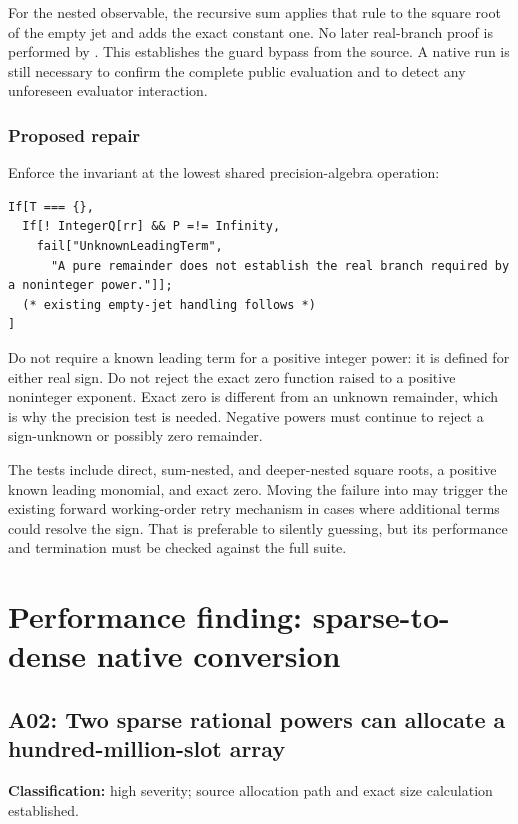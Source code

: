\documentclass[11pt,letterpaper]{article}
\newcommand{\code}[1]{\texttt{\detokenize{#1}}}
\newcommand{\finding}[3]{\subsection{#1: #2}\textbf{Classification:} #3.\par}
\begin{document}
For the nested observable, the recursive sum applies that rule to the square root of the empty jet and adds the exact constant one. No later real-branch proof is performed by \code{seriesMake}. This establishes the guard bypass from the source. A native run is still necessary to confirm the complete public evaluation and to detect any unforeseen evaluator interaction.

\subsubsection{Proposed repair}
Enforce the invariant at the lowest shared precision-algebra operation:
\par\noindent\begin{minipage}{\linewidth}
\begin{lstlisting}
If[T === {},
  If[! IntegerQ[rr] && P =!= Infinity,
    fail["UnknownLeadingTerm",
      "A pure remainder does not establish the real branch required by a noninteger power."]];
  (* existing empty-jet handling follows *)
]
\end{lstlisting}
\end{minipage}\par
Do not require a known leading term for a positive integer power: it is defined for either real sign. Do not reject the exact zero function raised to a positive noninteger exponent. Exact zero is different from an unknown remainder, which is why the precision test is needed. Negative powers must continue to reject a sign-unknown or possibly zero remainder.

The tests include direct, sum-nested, and deeper-nested square roots, a positive known leading monomial, and exact zero. Moving the failure into \code{fwdPower} may trigger the existing forward working-order retry mechanism in cases where additional terms could resolve the sign. That is preferable to silently guessing, but its performance and termination must be checked against the full suite.

\section{Performance finding: sparse-to-dense native conversion}
\finding{A02}{Two sparse rational powers can allocate a hundred-million-slot array}{high severity; source allocation path and exact size calculation established}
\end{document}
